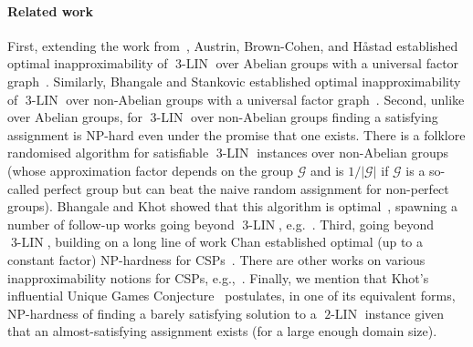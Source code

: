\documentclass[a4paper,11pt]{article}
\theoremstyle{definition}
\newcommand{\gr}{\mathscr{G}}
\newcommand{\eq}{\ensuremath{\operatorname{3-LIN}}}
\newcommand{\eqqq}{\ensuremath{\operatorname{2-LIN}}}
\begin{document}
\paragraph{Related work}
%
First, extending the work from~\cite{Hastad01:jacm}, Austrin, Brown-Cohen, and
H{\aa}stad established optimal inapproximability of $\eq$ over Abelian groups
with a universal factor graph~\cite{Austrin23:talg}. Similarly, Bhangale and
Stankovic established optimal inapproximability of $\eq$ over non-Abelian groups
with a universal factor graph~\cite{Bhangale23:algorithmica}.
%
Second, unlike over Abelian groups, for $\eq$ over non-Abelian groups finding a
satisfying assignment is NP-hard even under the promise that one exists. There
is a folklore randomised algorithm for satisfiable $\eq$ instances over
non-Abelian groups (whose approximation factor depends on the group $\gr$ and is
$1/|\gr|$ if $\gr$ is a so-called perfect group but can beat the naive random assignment for non-perfect groups).
Bhangale and Khot showed that this algorithm is optimal~\cite{Bhangale21:stoc},
spawning a number of follow-up works going beyond $\eq$, e.g.~\cite{Bhangale22:stoc,Bhangale23:stocII,Bhangale23:stocIII}.
%
Third, going beyond $\eq$, building on a long line of work Chan
established optimal (up to a constant factor) NP-hardness for
CSPs~\cite{Chan16:jacm}. There are other works on various inapproximability notions for
CSPs, e.g.,~\cite{Austrin13:toct,Khot14:stoc,Khot14:icalp}.
%
Finally, we mention that Khot's influential Unique Games
Conjecture~\cite{Khot02stoc} postulates, in one of its equivalent forms,
NP-hardness of finding a barely satisfying solution to a $\eqqq$ instance given
that an almost-satisfying assignment exists (for a large enough domain size).
\end{document}
